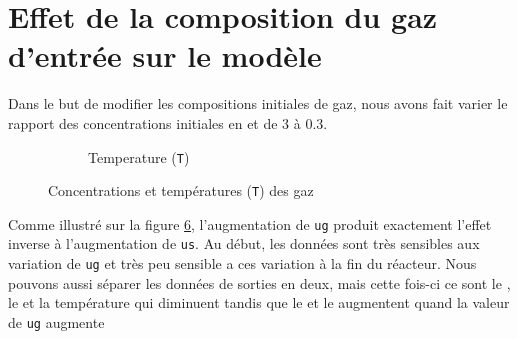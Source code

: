 \documentclass[11pt]{report}
\begin{document}
        \section{Effet de la composition du gaz d'entrée sur le modèle}
            Dans le but de modifier les compositions initiales de gaz,
            nous avons fait varier le rapport des concentrations initiales en  et  de 3 à 0.3.
            \begin{figure}[ht]
                \centering
                \begin{subfigure}[t]{0.325\textwidth}
                    \centering
                    
                    \caption{}
                    \label{graph:con:C0:CH4}
                \end{subfigure}
                \hfill
                \begin{subfigure}[t]{0.325\textwidth}
                    \centering
                    
                    \caption{}
                    \label{graph:con:C0:H2}
                \end{subfigure}
                \hfill
                \begin{subfigure}[t]{0.325\textwidth}
                    \centering
                    
                    \caption{}
                    \label{graph:con:C0:CO}
                \end{subfigure}
                \hfill
                \begin{subfigure}[t]{0.325\textwidth}
                    \centering
                    
                    \caption{}
                    \label{graph:con:C0:CO2}
                \end{subfigure}
                \begin{subfigure}[t]{0.325\textwidth}
                    \centering
                    
                    \caption{Temperature (\texttt{T})}
                    \label{graph:con:C0:T}
                \end{subfigure}
                \caption{Concentrations et températures (\texttt{T}) des gaz}
                \label{graph:con:C0}
            \end{figure}
            \par
            Comme illustré sur la figure \ref{graph:con:C0}, l'augmentation de \verb|ug| produit exactement l'effet 
            inverse à l'augmentation de \verb|us|. Au début, les données sont très sensibles aux variation de \verb|ug| 
            et très peu sensible a ces variation à la fin du réacteur. Nous pouvons aussi séparer les données 
            de sorties en deux, mais cette fois-ci ce sont le , le  et la température qui diminuent 
            tandis que le  et le  augmentent quand la valeur de \verb|ug| augmente
\end{document}
